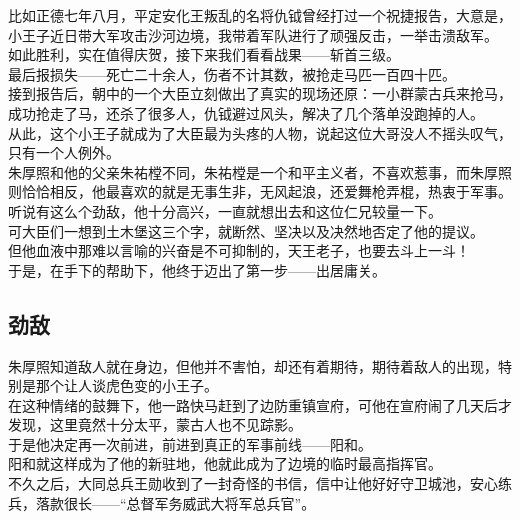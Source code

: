 \begin{multicols}{\theparacolNo}
比如正德七年八月，平定安化王叛乱的名将仇钺曾经打过一个祝捷报告，大意是，小王子近日带大军攻击沙河边境，我带着军队进行了顽强反击，一举击溃敌军。\\

如此胜利，实在值得庆贺，接下来我们看看战果——斩首三级。\\

最后报损失——死亡二十余人，伤者不计其数，被抢走马匹一百四十匹。\\

接到报告后，朝中的一个大臣立刻做出了真实的现场还原：一小群蒙古兵来抢马，成功抢走了马，还杀了很多人，仇钺避过风头，解决了几个落单没跑掉的人。\\

从此，这个小王子就成为了大臣最为头疼的人物，说起这位大哥没人不摇头叹气，只有一个人例外。\\

朱厚照和他的父亲朱祐樘不同，朱祐樘是一个和平主义者，不喜欢惹事，而朱厚照则恰恰相反，他最喜欢的就是无事生非，无风起浪，还爱舞枪弄棍，热衷于军事。听说有这么个劲敌，他十分高兴，一直就想出去和这位仁兄较量一下。\\

可大臣们一想到土木堡这三个字，就断然、坚决以及决然地否定了他的提议。\\

但他血液中那难以言喻的兴奋是不可抑制的，天王老子，也要去斗上一斗！\\

于是，在手下的帮助下，他终于迈出了第一步——出居庸关。\\

\subsection{劲敌}
朱厚照知道敌人就在身边，但他并不害怕，却还有着期待，期待着敌人的出现，特别是那个让人谈虎色变的小王子。\\

在这种情绪的鼓舞下，他一路快马赶到了边防重镇宣府，可他在宣府闹了几天后才发现，这里竟然十分太平，蒙古人也不见踪影。\\

于是他决定再一次前进，前进到真正的军事前线——阳和。\\

阳和就这样成为了他的新驻地，他就此成为了边境的临时最高指挥官。\\

不久之后，大同总兵王勋收到了一封奇怪的书信，信中让他好好守卫城池，安心练兵，落款很长——“总督军务威武大将军总兵官”。\\


\end{multicols}
